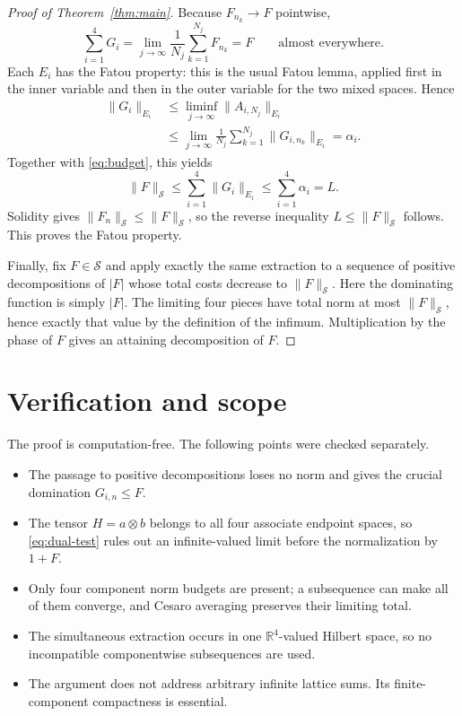 \documentclass[11pt]{article}
\newcommand{\Sspace}{\mathcal S}
\begin{document}
\begin{proof}[Proof of Theorem~\ref{thm:main}]
Because $F_{n_k}\to F$ pointwise,
\[
 \sum_{i=1}^4G_i
 =\lim_{j\to\infty}\frac1{N_j}\sum_{k=1}^{N_j}F_{n_k}
 =F
 \qquad\text{almost everywhere}.
\]
Each $E_i$ has the Fatou property: this is the usual Fatou lemma, applied
first in the inner variable and then in the outer variable for the two mixed
spaces.  Hence
\begin{align*}
 \|G_i\|_{E_i}
 &\leq\liminf_{j\to\infty}\|A_{i,N_j}\|_{E_i}\\
 &\leq\lim_{j\to\infty}
       \frac1{N_j}\sum_{k=1}^{N_j}\|G_{i,n_k}\|_{E_i}
 =\alpha_i.
\end{align*}
Together with \eqref{eq:budget}, this yields
\[
 \|F\|_{\Sspace}\leq\sum_{i=1}^4\|G_i\|_{E_i}
 \leq\sum_{i=1}^4\alpha_i=L.
\]
Solidity gives $\|F_n\|_{\Sspace}\leq\|F\|_{\Sspace}$, so the reverse
inequality $L\leq\|F\|_{\Sspace}$ follows.  This proves the Fatou property.

Finally, fix $F\in\Sspace$ and apply exactly the same extraction to a sequence
of positive decompositions of $|F|$ whose total costs decrease to
$\|F\|_{\Sspace}$.  Here the dominating function is simply $|F|$.  The
limiting four pieces have total norm at most $\|F\|_{\Sspace}$, hence exactly
that value by the definition of the infimum.  Multiplication by the phase of
$F$ gives an attaining decomposition of $F$.
\end{proof}

\section{Verification and scope}

The proof is computation-free.  The following points were checked separately.
\begin{itemize}
\item The passage to positive decompositions loses no norm and gives the
      crucial domination $G_{i,n}\leq F$.
\item The tensor $H=a\otimes b$ belongs to all four associate endpoint spaces,
      so \eqref{eq:dual-test} rules out an infinite-valued limit before the
      normalization by $1+F$.
\item Only four component norm budgets are present; a subsequence can make all
      of them converge, and Cesaro averaging preserves their limiting total.
\item The simultaneous extraction occurs in one $\mathbb R^4$-valued Hilbert
      space, so no incompatible componentwise subsequences are used.
\item The argument does not address arbitrary infinite lattice sums.  Its
      finite-component compactness is essential.
\end{itemize}
\end{document}
